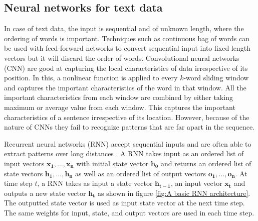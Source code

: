 \documentclass[a4paper, 11pt]{article}
\begin{document}
\subsection{Neural networks for text data}

In case of text data, the input is sequential and of unknown length, where the ordering of words is important. Techniques such as continuous bag of words \parencite{DBLP:journals/corr/abs-1301-3781} can be used with feed-forward networks to convert sequential input into fixed length vectors but it will discard the order of words. Convolutional neural networks (CNN) \parencite{Bengio1997} are good at capturing the local characteristics of data irrespective of its position. In this, a nonlinear function is applied to every $k$-word sliding window and captures the important characteristics of the word in that window. All the important characteristics from each window are combined by either taking maximum or average value from each window. This captures the important characteristics of a sentence irrespective of its location. However, because of the nature of CNNs they fail to recognize patterns that are far apart in the sequence.

Recurrent neural networks (RNN) accept sequential inputs and are often able to extract patterns over long distances \parencite{Elman}. A RNN takes input as an ordered list of input vectors $\mathrm{\mathbf{x_1},\dots,\mathbf{x_n}}$ with initial state vector $\mathbf{h_0}$ and returns an ordered list of state vectors $\mathrm{\mathbf{h_1},\dots,\mathbf{h_n}}$ as well as an ordered list of output vectors $\mathrm{\mathbf{o_1},\dots,\mathbf{o_n}}$. At time step $t$, a RNN takes as input a state vector $\mathbf{h_{t-1}}$, an input vector $\mathbf{x_{t}}$ and outputs a new state vector $\mathbf{h_{t}}$ as shown in figure \ref{fig:A basic RNN architecture}. The outputted state vector is used as input state vector at the next time step. The same weights for input, state, and output vectors are used in each time step.  

\end{document}
